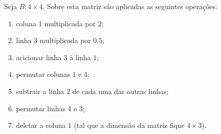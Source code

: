 \begin{questions}
     Seja $B : 4 \times 4$. Sobre esta matriz s\~{a}o aplicadas as seguintes opera\c{c}\~{o}es:
    \begin{enumerate}
        \item coluna 1 multiplicada por $2$;
        \item linha 3 multiplicada por $0.5$;
        \item acicionar linha $3$ \`{a} linha $1$;
        \item permutar colunas $1$ e $4$;
        \item subtrair a linha $2$ de cada uma das outras linhas;
        \item permutar linhas $4$ e $3$;
        \item deletar a coluna $1$ (tal que a dimens\~{a}o da matriz fique $4 \times 3$).
    \end{enumerate}
    \begin{parts}

\end{parts}
\end{questions}
